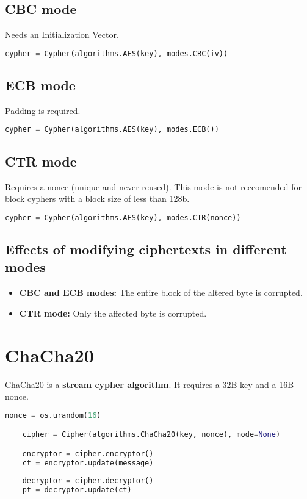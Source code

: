 \documentclass[a4paper, 12 pt]{memoir}
\begin{document}
\subsection{CBC mode}
Needs an Initialization Vector.
\begin{lstlisting}[language=Python]
    cypher = Cypher(algorithms.AES(key), modes.CBC(iv))
\end{lstlisting}

\subsection{ECB mode}
Padding is required.
\begin{lstlisting}[language=Python]
    cypher = Cypher(algorithms.AES(key), modes.ECB())
\end{lstlisting}

\subsection{CTR mode}
Requires a nonce (unique and never reused). This mode is not reccomended for block cyphers with a block size of less than 128b.
\begin{lstlisting}[language=Python]
    cypher = Cypher(algorithms.AES(key), modes.CTR(nonce))
\end{lstlisting}

\subsection{Effects of modifying ciphertexts in different modes}
\begin{itemize}
    \item \textbf{CBC and ECB modes:} The entire block of the altered byte is corrupted.
    \item \textbf{CTR mode:} Only the affected byte is corrupted.
\end{itemize}

\section{ChaCha20}
ChaCha20 is a \textbf{stream cypher algorithm}. It requires a 32B key and a 16B nonce.
\begin{lstlisting}[language=Python]
    nonce = os.urandom(16)

    cipher = Cipher(algorithms.ChaCha20(key, nonce), mode=None)

    encryptor = cipher.encryptor()
    ct = encryptor.update(message)
    
    decryptor = cipher.decryptor()
    pt = decryptor.update(ct)
\end{lstlisting}
\end{document}
